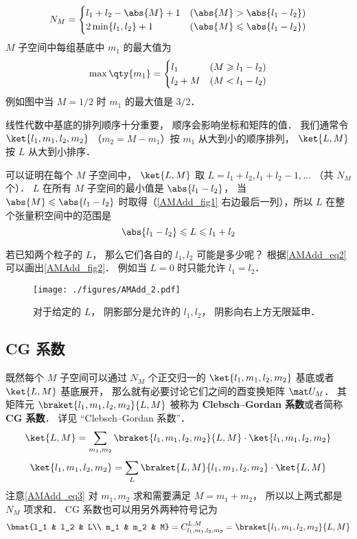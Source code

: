 \begin{equation}
N_M =
\begin{cases}
l_1 + l_2 - \abs{M} + 1 &(\abs{M} > \abs{l_1 - l_2}) \\
2\min\{l_1, l_2\}  + 1   &(\abs{M} \leqslant\abs{l_1 - l_2})
\end{cases}
\end{equation}
$M$ 子空间中每组基底中 $m_1$ 的最大值为
\begin{equation}
\max \qty{m_1} =
\begin{cases}
l_1 \quad &(M \geqslant l_1 - l_2)  \\
l_2 + M &(M < l_1 - l_2)
\end{cases}
\end{equation}
例如图中当 $M = 1/2$ 时 $m_1$ 的最大值是 $3/2$．

线性代数中基底的排列顺序十分重要， 顺序会影响坐标和矩阵的值． 我们通常令 $\ket{l_1, m_1, l_2, m_2}$ （$m_2 = M - m_1$）按 $m_1$ 从大到小的顺序排列， $\ket{L, M}$ 按 $L$ 从大到小排序．

可以证明在每个 $M$ 子空间中， $\ket{L, M}$ 取 $L = l_1 + l_2, l_1 + l_2 - 1,\dots$ （共 $N_M$ 个）． %
$L$ 在所有 $M$ 子空间的最小值是 $\abs{l_1 - l_2}$， 当 $\abs{M} \leqslant \abs{l_1 - l_2}$ 时取得（\autoref{AMAdd_fig1} 右边最后一列），所以 $L$ 在整个张量积空间中的范围是
\begin{equation}\label{AMAdd_eq2}
\abs{l_1 - l_2} \leqslant L \leqslant l_1 + l_2
\end{equation}

若已知两个粒子的 $L$， 那么它们各自的 $l_1, l_2$ 可能是多少呢？ 根据\autoref{AMAdd_eq2} 可以画出\autoref{AMAdd_fig2}． 例如当 $L = 0$ 时只能允许 $l_1 = l_2$．
\begin{figure}[ht]
\centering
\texttt{[image: ./figures/AMAdd\_2.pdf]}
\caption{对于给定的 $L$， 阴影部分是允许的 $l_1, l_2$， 阴影向右上方无限延申．} \label{AMAdd_fig2}
\end{figure}

\subsection{CG 系数}
既然每个 $M$ 子空间可以通过 $N_M$ 个正交归一的 $\ket{l_1, m_1, l_2, m_2}$ 基底或者 $\ket{L,M}$ 基底展开， 那么就有必要讨论它们之间的酉变换矩阵 $\mat U_M$． 其矩阵元 $\braket{l_1, m_1, l_2, m_2}{L, M}$ 被称为 \textbf{Clebsch–Gordan 系数}或者简称 \textbf{CG 系数}． 详见 “Clebsch–Gordan 系数”．
\begin{equation}\label{AMAdd_eq3}
\ket{L, M} = \sum_{m_1, m_2}\braket{l_1, m_1, l_2, m_2}{L, M} \cdot \ket{l_1, m_1, l_2, m_2}
\end{equation}
\begin{equation}
\ket{l_1, m_1, l_2, m_2} = \sum_{L}\braket{L, M}{l_1, m_1, l_2, m_2} \cdot \ket{L, M}
\end{equation}
注意\autoref{AMAdd_eq3} 对 $m_1,m_2$ 求和需要满足 $M = m_1 + m_2$， 所以以上两式都是 $N_M$ 项求和． CG 系数也可以用另外两种符号记为
\begin{equation}
\bmat{l_1 & l_2 & L\\ m_1 & m_2 & M} = C_{l_1, m_1, l_2, m_2}^{L, M} = \braket{l_1, m_1, l_2, m_2}{L, M}
\end{equation}

